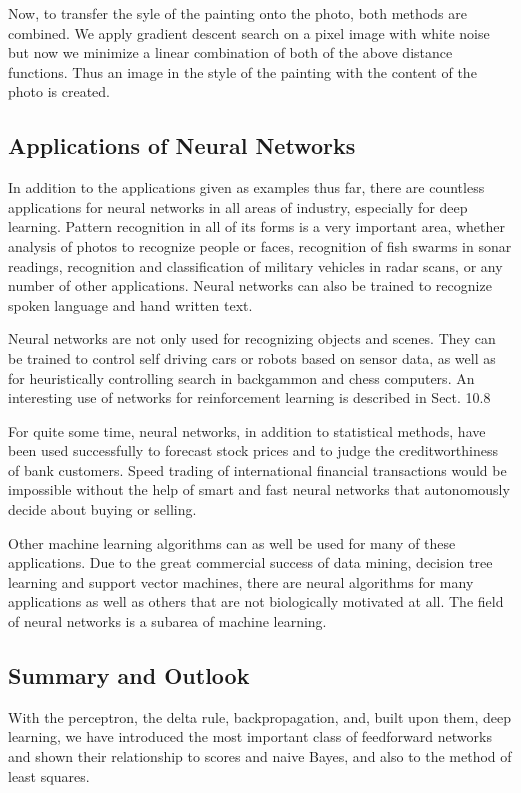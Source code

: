 \documentclass[10pt]{book}
\begin{document}
Now, to transfer the syle of the painting onto the photo, both methods are combined. We apply gradient descent search on a pixel image with white noise but now we minimize a linear combination of both of the above distance functions. Thus an image in the style of the painting with the content of the photo is created.

\subsection*{Applications of Neural Networks}
In addition to the applications given as examples thus far, there are countless applications for neural networks in all areas of industry, especially for deep learning. Pattern recognition in all of its forms is a very important area, whether analysis of photos to recognize people or faces, recognition of fish swarms in sonar readings, recognition and classification of military vehicles in radar scans, or any number of other applications. Neural networks can also be trained to recognize spoken language and hand written text.

Neural networks are not only used for recognizing objects and scenes. They can be trained to control self driving cars or robots based on sensor data, as well as for heuristically controlling search in backgammon and chess computers. An interesting use of networks for reinforcement learning is described in Sect. 10.8

For quite some time, neural networks, in addition to statistical methods, have been used successfully to forecast stock prices and to judge the creditworthiness of bank customers. Speed trading of international financial transactions would be impossible without the help of smart and fast neural networks that autonomously decide about buying or selling.


Other machine learning algorithms can as well be used for many of these applications. Due to the great commercial success of data mining, decision tree learning and support vector machines, there are neural algorithms for many applications as well as others that are not biologically motivated at all. The field of neural networks is a subarea of machine learning.

\subsection*{Summary and Outlook}
With the perceptron, the delta rule, backpropagation, and, built upon them, deep learning, we have introduced the most important class of feedforward networks and shown their relationship to scores and naive Bayes, and also to the method of least squares.
\end{document}
